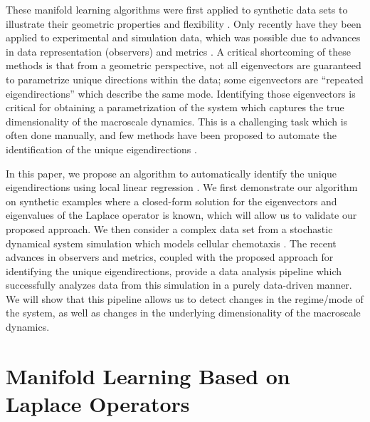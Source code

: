 %
These manifold learning algorithms were first applied to synthetic data sets to illustrate their geometric properties and flexibility \cite{coifman2005geometric, nadler2006diffusion}.
%
Only recently have they been applied to experimental and simulation data, which was possible due to advances in data representation (observers) and metrics \cite{rubner2000earth,mallat2012group,talmon2013empirical,zhao2014rotationally, rohrdanz2011determination}.
%
A critical shortcoming of these methods is that from a geometric perspective, not all eigenvectors are guaranteed to parametrize unique directions within the data; some eigenvectors are ``repeated eigendirections'' which describe the same mode.
%
Identifying those eigenvectors is critical for obtaining a parametrization of the system which captures the true dimensionality of the macroscale dynamics.
%
This is a challenging task which is often done manually, and few methods have been proposed to automate the identification of the unique eigendirections \cite{gerber2007robust}.

In this paper, we propose an algorithm to automatically identify the unique eigendirections using local linear regression \cite{wasserman2006all}.
%
We first demonstrate our algorithm on synthetic examples where a closed-form solution for the eigenvectors and eigenvalues of the Laplace operator is known, which will allow us to validate our proposed approach.
%
We then consider a complex data set from a stochastic dynamical system simulation which models cellular chemotaxis \cite{othmer1988models}.
%
The recent advances in observers and metrics, coupled with the proposed approach for identifying the unique eigendirections, provide a data analysis pipeline which successfully analyzes data from this simulation in a purely data-driven manner.
%
We will show that this pipeline allows us to detect changes in the regime/mode of the system, as well as changes in the underlying dimensionality of the macroscale dynamics.


\section{Manifold Learning Based on Laplace Operators}
%
%

